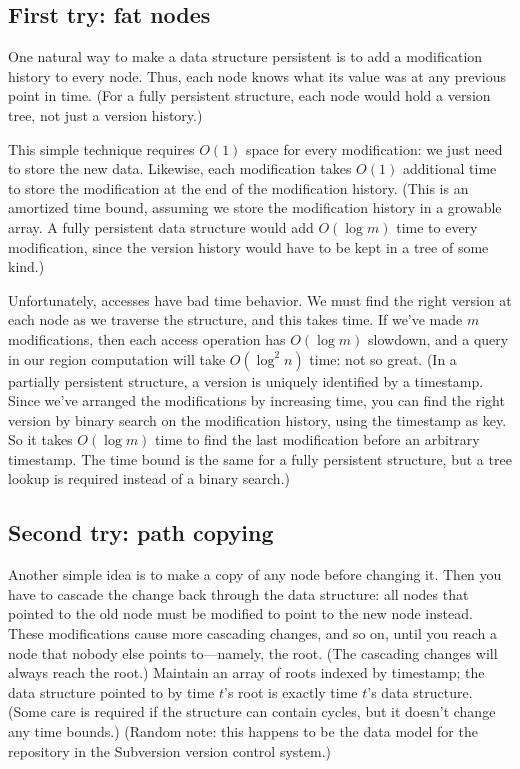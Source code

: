 \documentclass{article}
\begin{document}
\subsection{First try: fat nodes}

One natural way to make a data structure persistent is to add a
modification history to every node. Thus, each node knows what its value
was at any previous point in time. (For a fully persistent structure, each
node would hold a version tree, not just a version history.)

This simple technique requires $O(1)$ space for every modification: we just
need to store the new data. Likewise, each modification takes $O(1)$
additional time to store the modification at the end of the modification
history. (This is an amortized time bound, assuming we store the
modification history in a growable array. A fully persistent data structure
would add $O(\log m)$ time to every modification, since the version
history would have to be kept in a tree of some kind.)

Unfortunately, accesses have bad time behavior. We must find the right
version at each node as we traverse the structure, and this takes time. If
we've made $m$ modifications, then each access operation has $O(\log m)$
slowdown, and a query in our region computation will take $O(\log^2 n)$ time: not so great.
(In a partially persistent structure, a version is uniquely
identified by a timestamp. Since we've arranged the modifications by
increasing time, you can find the right version by binary search on the
modification history, using the timestamp as key. So it takes $O(\log m)$
time to find the last modification before an arbitrary timestamp. The time
bound is the same for a fully persistent structure, but a tree lookup is
required instead of a binary search.)


\subsection{Second try: path copying}

Another simple idea is to make a copy of any node before changing
it. Then you have to cascade the change back through the data
structure: all nodes that pointed to the old node must be modified
to point to the new node instead. These modifications cause more
cascading changes, and so on, until you reach a node that nobody
else points to---namely, the root. (The cascading changes will
always reach the root.) Maintain an array of roots indexed by
timestamp; the data structure pointed to by time $t$'s root is
exactly time $t$'s data structure. (Some care is required if the
structure can contain cycles, but it doesn't change any time
bounds.)  (Random note: this happens to be the data model for the
repository in the Subversion version control system.)
\end{document}
